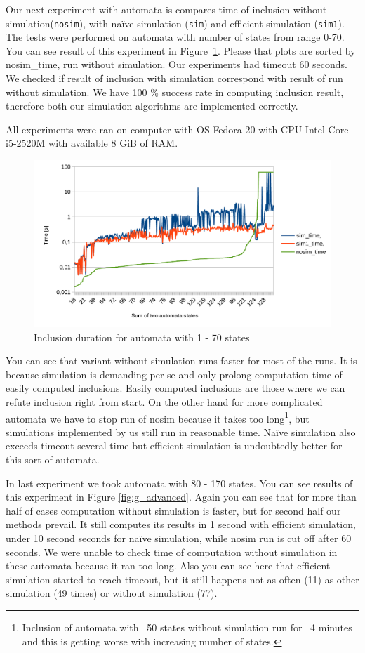 \documentclass[a4paper, 12pt]{article}
\begin{document}
Our next experiment with automata is compares time of inclusion without simulation(\texttt{nosim}), with na{\"i}ve simulation (\texttt{sim}) and efficient simulation (\texttt{sim1}). The tests were performed on automata with number of states from range 0-70. You can see result of this experiment in Figure~\ref{fig:g2}.  Please that plots are sorted by nosim\_time, run without simulation. Our experiments had timeout 60 seconds. We checked if result of inclusion with simulation correspond with result of run without simulation. We have 100 \% success rate in computing inclusion result, therefore both our simulation algorithms are implemented correctly.

All experiments were ran on computer with OS Fedora 20 with CPU Intel Core i5-2520M with available 8 GiB of RAM.

\begin{figure}[h!]
	\centering
	\includegraphics{g2}
	\caption{Inclusion duration for automata with 1 - 70 states}
	\label{fig:g2}
\end{figure}

You can see that variant without simulation runs faster for most of the runs. It is because simulation is demanding per se and only prolong computation time of easily computed inclusions. Easily computed inclusions are those where we can refute inclusion right from start. On the other hand for more complicated automata we have to stop run of nosim because it takes too long\footnote{Inclusion of automata with ~50 states without simulation run for ~4 minutes and this is getting worse with increasing number of states.}, but simulations implemented by us still run in reasonable time. Na{\"i}ve simulation also exceeds timeout several time but efficient simulation is undoubtedly better for this sort of automata.

In last experiment we took automata with 80 - 170 states. You can see results of this experiment in Figure \ref{fig:g_advanced}. Again you can see that for more than half of cases computation without simulation is faster, but for second half our methods  prevail. It still computes its results in 1 second with efficient simulation, under 10 second seconds for na{\"i}ve simulation, while nosim run is cut off after 60 seconds. We were unable to check time of computation without simulation in these automata because it ran too long. Also you can see here that efficient simulation started to reach timeout, but it still happens not as often (11) as other simulation (49 times) or without simulation (77).
\end{document}
